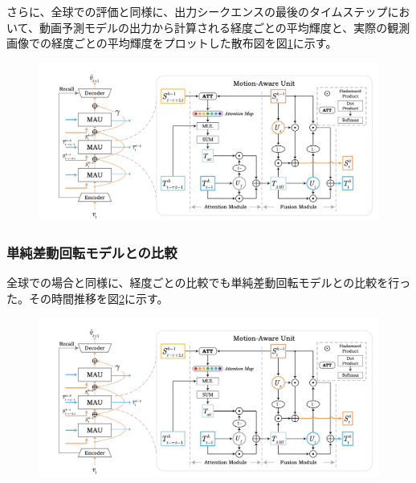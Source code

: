           さらに、全球での評価と同様に、出力シークエンスの最後のタイムステップにおいて、動画予測モデルの出力から計算される経度ごとの平均輝度と、実際の観測画像での経度ごとの平均輝度をプロットした散布図を図\ref{fig:exp1_mean_intensity_longitude_scatter}に示す。
          
          \begin{figure}[htpb]
            \centering
            \includegraphics[width=\textwidth]{figures/mau.png}
            \caption{}
            \label{fig:exp1_mean_intensity_longitude_scatter}
          \end{figure}

        \subsubsection{単純差動回転モデルとの比較}
          全球での場合と同様に、経度ごとの比較でも単純差動回転モデルとの比較を行った。その時間推移を図\ref{fig:exp1_sdr_longitude_line}に示す。
          \begin{figure}[htbp]
            \centering
            \includegraphics[width=\textwidth]{figures/mau.png}
            \caption{}
            \label{fig:exp1_sdr_longitude_line}
          \end{figure}
          
